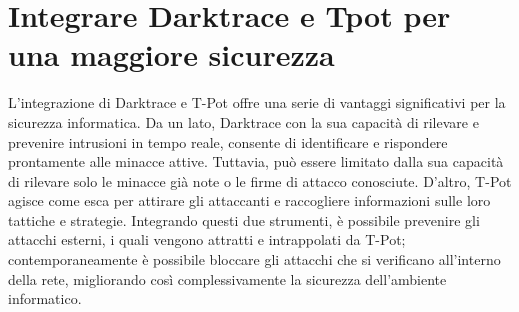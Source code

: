 \section{Integrare Darktrace e Tpot per una maggiore sicurezza}
L'integrazione di Darktrace e T-Pot offre una serie di vantaggi significativi per la sicurezza informatica. Da un lato, Darktrace con la sua capacità di rilevare e prevenire intrusioni in tempo reale, consente di identificare e rispondere prontamente alle minacce attive. Tuttavia, può essere limitato dalla sua capacità di rilevare solo le minacce già note o le firme di attacco conosciute. D'altro, T-Pot agisce come esca per attirare gli attaccanti e raccogliere informazioni sulle loro tattiche e strategie. Integrando questi due strumenti, è possibile prevenire gli attacchi esterni, i quali vengono attratti e intrappolati da T-Pot; contemporaneamente è possibile bloccare gli attacchi che si verificano all'interno della rete, migliorando così complessivamente la sicurezza dell'ambiente informatico.